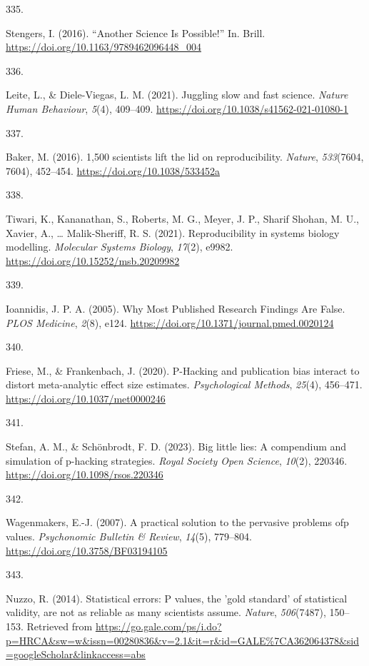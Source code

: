 \documentclass[
  11pt,
  letterpaper,
]{scrreprt}
\newlength{\cslhangindent}
\newlength{\csllabelwidth}
\newenvironment{CSLReferences}[2] %
 {\begin{list}{}{%
  \setlength{\itemindent}{0pt}
  \setlength{\leftmargin}{0pt}
  \setlength{\parsep}{0pt}
  \ifodd #1
   \setlength{\leftmargin}{\cslhangindent}
   \setlength{\itemindent}{-1\cslhangindent}
  \fi
  \setlength{\itemsep}{#2\baselineskip}}}
 {\end{list}}
\newcommand{\CSLLeftMargin}[1]{\parbox[t]{\csllabelwidth}{\strut#1\strut}}
\newcommand{\CSLRightInline}[1]{\parbox[t]{\linewidth - \csllabelwidth}{\strut#1\strut}}
\begin{document}
\begin{CSLReferences}{0}{0}
\CSLLeftMargin{335. }%
\CSLRightInline{Stengers, I. (2016). {``{Another Science Is
Possible}!''} In. Brill.
\url{https://doi.org/10.1163/9789462096448_004}}

\CSLLeftMargin{336. }%
\CSLRightInline{Leite, L., \& Diele-Viegas, L. M. (2021). Juggling slow
and fast science. \emph{Nature Human Behaviour}, \emph{5}(4), 409--409.
\url{https://doi.org/10.1038/s41562-021-01080-1}}

\CSLLeftMargin{337. }%
\CSLRightInline{Baker, M. (2016). 1,500 scientists lift the lid on
reproducibility. \emph{Nature}, \emph{533}(7604, 7604), 452--454.
\url{https://doi.org/10.1038/533452a}}

\CSLLeftMargin{338. }%
\CSLRightInline{Tiwari, K., Kananathan, S., Roberts, M. G., Meyer, J.
P., Sharif Shohan, M. U., Xavier, A., \ldots{} Malik-Sheriff, R. S.
(2021). Reproducibility in systems biology modelling. \emph{Molecular
Systems Biology}, \emph{17}(2), e9982.
\url{https://doi.org/10.15252/msb.20209982}}

\CSLLeftMargin{339. }%
\CSLRightInline{Ioannidis, J. P. A. (2005). Why {Most Published Research
Findings Are False}. \emph{PLOS Medicine}, \emph{2}(8), e124.
\url{https://doi.org/10.1371/journal.pmed.0020124}}

\CSLLeftMargin{340. }%
\CSLRightInline{Friese, M., \& Frankenbach, J. (2020). P-{Hacking} and
publication bias interact to distort meta-analytic effect size
estimates. \emph{Psychological Methods}, \emph{25}(4), 456--471.
\url{https://doi.org/10.1037/met0000246}}

\CSLLeftMargin{341. }%
\CSLRightInline{Stefan, A. M., \& Schönbrodt, F. D. (2023). Big little
lies: A compendium and simulation of p-hacking strategies. \emph{Royal
Society Open Science}, \emph{10}(2), 220346.
\url{https://doi.org/10.1098/rsos.220346}}

\CSLLeftMargin{342. }%
\CSLRightInline{Wagenmakers, E.-J. (2007). A practical solution to the
pervasive problems ofp values. \emph{Psychonomic Bulletin \& Review},
\emph{14}(5), 779--804. \url{https://doi.org/10.3758/BF03194105}}

\CSLLeftMargin{343. }%
\CSLRightInline{Nuzzo, R. (2014). Statistical errors: {P} values, the
'gold standard' of statistical validity, are not as reliable as many
scientists assume. \emph{Nature}, \emph{506}(7487), 150--153. Retrieved
from
\url{https://go.gale.com/ps/i.do?p=HRCA&sw=w&issn=00280836&v=2.1&it=r&id=GALE\%7CA362064378&sid=googleScholar&linkaccess=abs}}


\end{CSLReferences}
\end{document}
